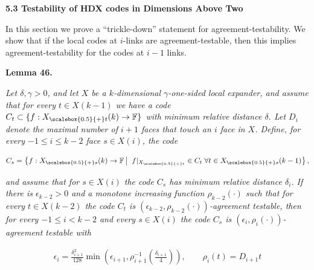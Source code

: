 \documentclass[10pt,a4paper]{article}
\begin{document}
\par\medskip\noindent\textbf{
5.3 Testability of HDX codes in Dimensions Above Two}\par




In this section we prove a “trickle-down” statement for agreement-testability. We show that if the local codes at $i$-links are agreement-testable, then this implies agreement-testability for the codes at $i-1$ links.\par





\par\medskip\noindent\textbf{
\textbf{Lemma 46}\textbf{.}
}\par



\emph{Let $\delta,\gamma>0$, and let $X$ be a $k$-dimensional $\gamma$-one-sided local expander, and assume that for every $t\in X(k-1)$ we have a code $C_{t}\subset\{f:{X}_{\scalebox{0.5}{+}t}(k)\to\mathbb{F}\}$ with minimum relative distance $\delta$. Let $D_{i}$ denote the maximal number of $i+1$ faces that touch an $i$ face in $X$.
Define, for every $-1\leq i\leq k-2$ face $s\in X(i)$, the code}\par


\[\begin{gathered}
C_{s}=\left\{f:{X}_{\scalebox{0.5}{+}s}(k)\to\mathbb{F}\left|\;\vphantom{f:{X}_{\scalebox{0.5}{+}s}(k)\to\mathbb{F}f|_{{X}_{\scalebox{0.5}{+}t}}\in C_{t}\;\forall t\in{X}_{\scalebox{0.5}{+}s}(k-1)}\right.f|_{{X}_{\scalebox{0.5}{+}t}}\in C_{t}\;\forall t\in{X}_{\scalebox{0.5}{+}s}(k-1)\right\},
\end{gathered}\]


\emph{and assume that for $s\in X(i)$ the code $C_{s}$ has minimum relative distance $\delta_{i}$.
If there is $\epsilon_{k-2}>0$ and a monotone increasing function $\rho_{k-2}(\cdot)$ such that for every $t\in X(k-2)$ the code $C_{t}$ is $(\epsilon_{k-2},\rho_{k-2}(\cdot))$-agreement testable, then for every $-1\leq i<k-2$ and every $s\in X(i)$ the code $C_{s}$ is $(\epsilon_{i},\rho_{i}(\cdot))$-agreement testable with}\par


\[\begin{gathered}
\epsilon_{i}=\frac{\delta_{i+1}^{2}}{128}\min\left(\epsilon_{i+1},\rho_{i+1}^{-1}\left(\frac{\delta_{i+1}}{4}\right)\right),\qquad\rho_{i}(t)=D_{i+1}t
\end{gathered}\]
\end{document}
